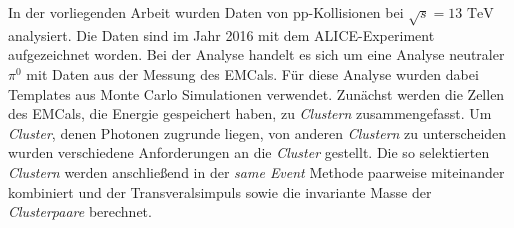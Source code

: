 In der vorliegenden Arbeit wurden Daten von pp-Kollisionen bei $\sqrt{s}=13\text{ TeV}$ analysiert.
Die Daten sind im Jahr 2016 mit dem ALICE-Experiment aufgezeichnet worden.
Bei der Analyse handelt es sich um eine Analyse neutraler $\pi^{0}$ mit  Daten aus der Messung des EMCals.
Für diese Analyse wurden dabei Templates aus Monte Carlo Simulationen verwendet.
\newline
Zunächst werden die Zellen des EMCals, die Energie gespeichert haben, zu \textit{Clustern} zusammengefasst.
Um \textit{Cluster}, denen Photonen zugrunde liegen, von anderen \textit{Clustern} zu unterscheiden wurden verschiedene Anforderungen an die \textit{Cluster} gestellt.
Die so selektierten \textit{Clustern} werden anschließend in der \textit{same Event} Methode paarweise miteinander kombiniert und der Transveralsimpuls sowie die invariante Masse der \textit{Clusterpaare} berechnet.